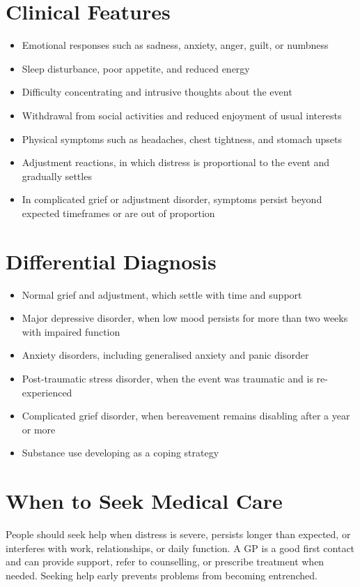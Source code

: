 \section*{Clinical Features}
\begin{itemize}
    \item Emotional responses such as sadness, anxiety, anger, guilt, or numbness
    \item Sleep disturbance, poor appetite, and reduced energy
    \item Difficulty concentrating and intrusive thoughts about the event
    \item Withdrawal from social activities and reduced enjoyment of usual interests
    \item Physical symptoms such as headaches, chest tightness, and stomach upsets
    \item Adjustment reactions, in which distress is proportional to the event and gradually settles
    \item In complicated grief or adjustment disorder, symptoms persist beyond expected timeframes or are out of proportion
\end{itemize}

\section*{Differential Diagnosis}
\begin{itemize}
    \item Normal grief and adjustment, which settle with time and support
    \item Major depressive disorder, when low mood persists for more than two weeks with impaired function
    \item Anxiety disorders, including generalised anxiety and panic disorder
    \item Post-traumatic stress disorder, when the event was traumatic and is re-experienced
    \item Complicated grief disorder, when bereavement remains disabling after a year or more
    \item Substance use developing as a coping strategy
\end{itemize}

\section*{When to Seek Medical Care}
People should seek help when distress is severe, persists longer than expected, or interferes with work, relationships, or daily function. A GP is a good first contact and can provide support, refer to counselling, or prescribe treatment when needed. Seeking help early prevents problems from becoming entrenched.

